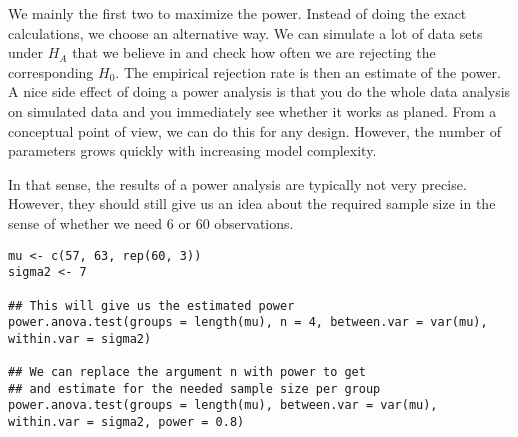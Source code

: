 We mainly the first two to maximize the power. Instead of doing the exact calculations, we choose an alternative way. We can simulate a lot of data sets under $H_A$ that we believe in and check how often we are rejecting the corresponding $H_0$. The empirical rejection rate is then an estimate of the power. A nice side effect of doing a power analysis is that you do the whole data analysis on simulated data and you immediately see whether it works as planed. From a conceptual point of view, we can do this for any design. However, the number of parameters grows quickly with increasing model complexity. \medskip

In that sense, the results of a power analysis are typically not very precise. However, they should still give us an idea about the required sample size in the sense of whether we need 6 or 60 observations.

\begin{lstlisting}
mu <- c(57, 63, rep(60, 3)) 
sigma2 <- 7 

## This will give us the estimated power
power.anova.test(groups = length(mu), n = 4, between.var = var(mu), within.var = sigma2)

## We can replace the argument n with power to get 
## and estimate for the needed sample size per group
power.anova.test(groups = length(mu), between.var = var(mu), within.var = sigma2, power = 0.8)
\end{lstlisting}
